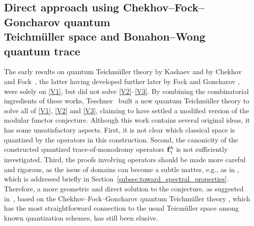 \documentclass[10pt,a4paper]{amsart}
\numberwithin{equation}{section}
\theoremstyle{definition}
\begin{document}
\subsection[Direct approach using Chekhov--Fock--Goncharov quantum Teichm\"uller space and Bonahon--Wong quantum trace]{Direct approach using Chekhov--Fock--Goncharov quantum \\ Teichm\"uller space and Bonahon--Wong quantum trace}
The early results on quantum Teichm\"uller theory by Kashaev \cite{Kash98} and by Chekhov and Fock~\cite{CF}, the latter having developed further later by Fock and Goncharov \cite{FG09}, were solely on \ref{V1}, but did not solve \ref{V2}--\ref{V3}. By combining the combinatorial ingredients of these works, Teschner~\cite{T} built a new quantum Teichm\"uller theory to solve all of \ref{V1}, \ref{V2} and \ref{V3}, claiming to have settled a modified version of the modular functor conjecture. Although this work \cite{T} contains several original ideas, it has some unsatisfactory aspects. First, it is not clear which classical space is quantized by the operators in this construction. Second, the canonicity of the constructed quantized trace-of-monodromy operators ${\bf f}^\hbar_\gamma$ is not sufficiently investigated. Third, the proofs involving operators should be made more careful and rigorous, as the issue of domains can become a subtle matter, e.g., as in \cite{Ruijsenaars}, which is addressed briefly in Section~\ref{subsec:toward_spectral_properties}. Therefore, a more geometric and direct solution to the conjecture, as suggested in~\cite{F97, FG09}, based on the Chekhov--Fock--Goncharov quantum Teichm\"uller theory \cite{F97, CF, FG09}, which has the most straightforward connection to the usual Teicm\"uller space among known quantization schemes, has still been elusive.
\end{document}
